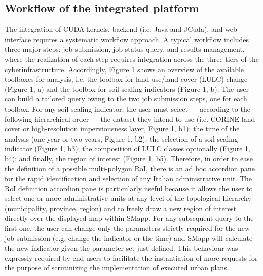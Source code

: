 \documentclass[APA,LATO1COL,doublespace]{WileyNJD-v2}
\begin{document}
\subsection{Workflow of the integrated platform}
The integration of CUDA kernels, backend (i.e. Java and JCuda), and web interface requires a systematic workflow approach. A typical workflow includes three major steps: job submission, job status query, and results management, where the realization of each step requires integration across the three tiers of the cyberinfrastructure. 
Accordingly, Figure 1 shows an overview of the available toolboxes for analysis, i.e. the toolbox for land use/land cover (LULC) change (Figure 1, a) and the toolbox for soil sealing indicators (Figure 1, b). The user can build a tailored query owing to the two job submission steps, one for each toolbox. For any soil sealing indicator, the user must select — according to the following hierarchical order — the dataset they intend to use (i.e. CORINE land cover or high-resolution imperviousness layer, Figure 1, b1); the time of the analysis (one year or two years, Figure 1, b2); the selection of a soil sealing indicator (Figure 1, b3); the composition of LULC classes optionally (Figure 1, b4); and finally, the region of interest (Figure 1, b5). Therefore, in order to ease the definition of a possible multi-polygon RoI, there is an ad hoc accordion pane for the rapid identification and selection of any Italian administrative unit. The RoI definition accordion pane is particularly useful because it allows the user to select one or more administrative units at any level of the topological hierarchy (municipality, province, region) and to freely draw a new region of interest directly over the displayed map within SMapp. For any subsequent query to the first one, the user can change only the parameters strictly required for the new job submission (e.g. change the indicator or the time) and SMapp will calculate the new indicator given the parameter set just defined. This behaviour was expressly required by end users to facilitate the instantiation of more requests for the purpose of scrutinizing the implementation of executed urban plans.
\end{document}

